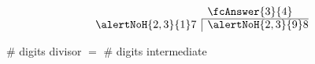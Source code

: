 \begin{frame}
\[\begin{array}{@{}l@{}l@{}ll@{}l@{}l}&&&\fcAnswer{3}{{4}}&\\\cline{4 - 5} 
\alertNoH{2, 3}{{1}}&7&&\multicolumn{1}{|l@{}}{\alertNoH{2, 3}{{9}}}&8& 
\end{array}\]

\# digits divisor $=$ \# digits intermediate\end{frame}